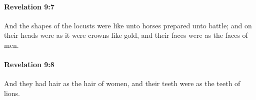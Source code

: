 		\paragraph{Revelation 9:7} %
			\label{REVELATIONNT-9-7}

			And the shapes of the locusts were like unto horses prepared unto battle; and on their heads were as it were crowns like gold, and their faces were as the faces of men.

			\begin{framed}
			\scriptsize
				\begin{compactdesc}
					\item[SBLG] 
				\end{compactdesc}
			\end{framed}

		\paragraph{Revelation 9:8} %
			\label{REVELATIONNT-9-8}

			And they had hair as the hair of women, and their teeth were as the teeth of lions.

